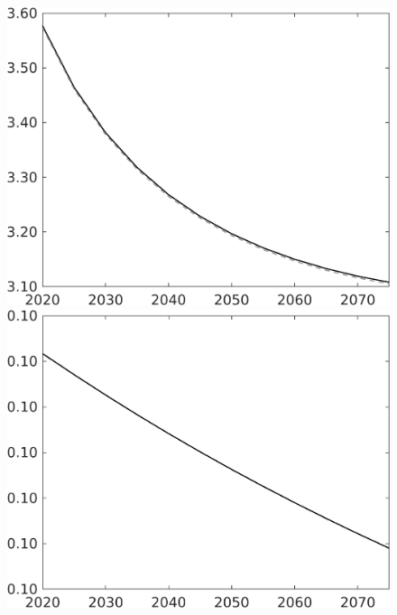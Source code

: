 \documentclass[12pt]{article}
\begin{document}
\begin{figure}[h!!]
\begin{minipage}[]{0.32\textwidth}
	\end{minipage}	
	\begin{minipage}[]{0.32\textwidth}
		\includegraphics[width=1\textwidth]{../../codding_model/own_basedOnFried/optimalPol_010922_revision/figures/all_13Sept22/CompTaul_LFBAU_Reg0_pgpftf_spillover0_nsk0_xgr1_knspil0_sep1_countec0_GovRev0_etaa0.79_lgd0.png}
	\end{minipage}	
	\begin{minipage}[]{0.32\textwidth}
		\includegraphics[width=1\textwidth]{../../codding_model/own_basedOnFried/optimalPol_010922_revision/figures/all_13Sept22/CompTaul_LFBAUPer_Reg0_pgpftf_spillover0_nsk0_xgr1_knspil0_sep1_countec0_GovRev0_etaa0.79.png}

\end{minipage}
\end{figure}
\end{document}
